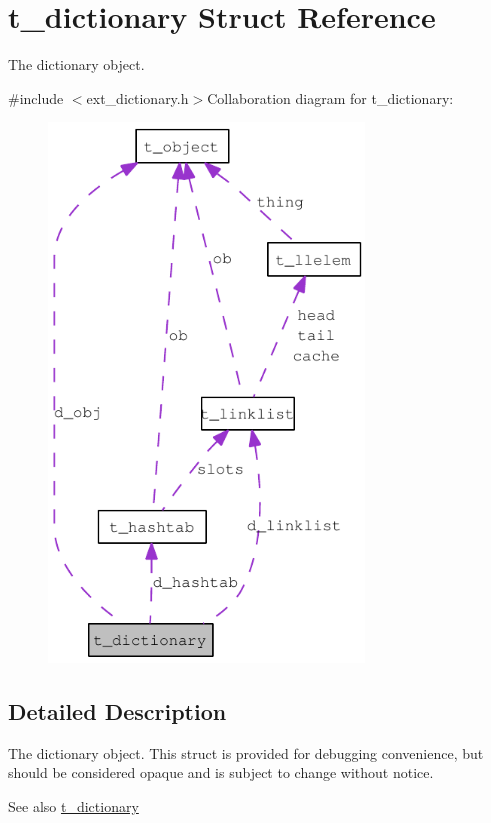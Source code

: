 \hypertarget{structt__dictionary}{
\section{t\_\-dictionary Struct Reference}
\label{structt__dictionary}
}


The dictionary object.  


{\ttfamily \#include $<$ext\_\-dictionary.h$>$}Collaboration diagram for t\_\-dictionary:\nopagebreak
\begin{figure}[H]
\begin{center}
\leavevmode
\includegraphics[width=238pt]{structt__dictionary__coll__graph}
\end{center}
\end{figure}


\subsection{Detailed Description}
The dictionary object. This struct is provided for debugging convenience, but should be considered opaque and is subject to change without notice.

\begin{DoxySeeAlso}{See also}
\hyperlink{structt__dictionary}{t\_\-dictionary} 
\end{DoxySeeAlso}
